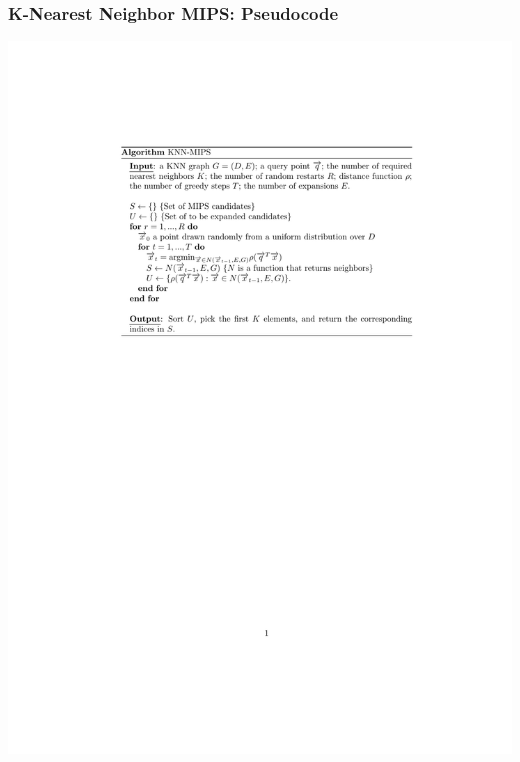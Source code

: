 \documentclass{beamer}
\begin{document}

\begin{frame}[fragile]
\frametitle{K-Nearest Neighbor MIPS: Pseudocode}

\begin{minipage}[c]{1.4\textwidth}
    \vspace{-2cm} %
    \hspace{-2.5cm}
    \includegraphics[width=\linewidth]{GNN/imgs/KNN-MIPS.pdf}
\end{minipage}

\end{frame}

\end{document}
